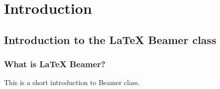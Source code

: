 \section{Introduction}
\subsection{Introduction to the LaTeX Beamer class}

\frame
{
	\frametitle{What is LaTeX Beamer?}
	This is a short introduction to Beamer class.
}
